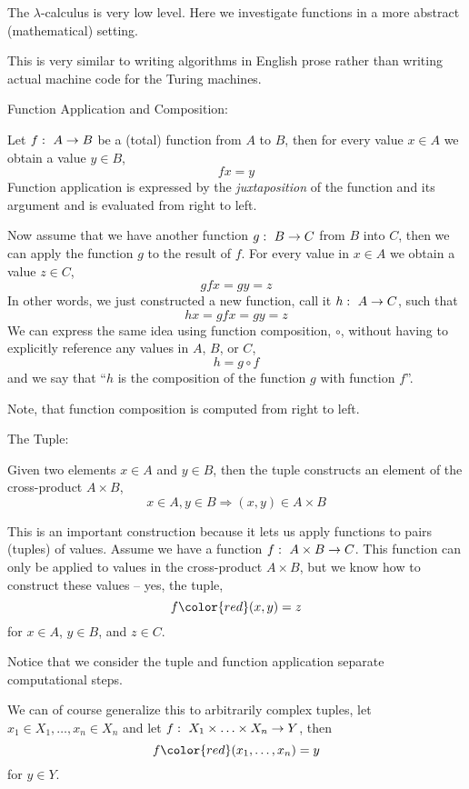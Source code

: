\documentclass[a4paper,blends,pdf,colorBG,slideColor]{prosper}
\begin{document}
The $\lambda$-calculus is very low level.  Here we investigate functions in a more abstract (mathematical) setting.

This is very similar to writing algorithms in English prose rather than writing actual machine code for the 
Turing machines.
\es

\small
Function Application and Composition:

Let $f\,\colon\; A \rightarrow B$ be a (total) function from $A$ to $B$, then
for every value $x\in A$ we obtain a value $y\in B$,
\[
f x = y
\]
Function application is expressed by the {\em juxtaposition} of the function and its argument and
is evaluated from right to left.

Now assume that we have another function $g\,\colon\; B \rightarrow C$ from $B$ into $C$, then
we can apply the function $g$ to the result of $f$.  For every value in $x\in A$
we obtain a value $z\in C$,
\[
g f x = g y = z
\]
In other words, we just constructed a new function, call it $h\,\colon\; A \rightarrow C$, such that
\[
h x = g f x = g y = z
\]
We can express the same idea using function composition, $\circ$, without having to 
explicitly reference any values in $A$, $B$, or $C$,
\[
h = g \circ f
\]
and we say that ``$h$ is the composition of the function $g$ with function $f$''.

Note, that function composition is computed from right to left.

\es

\small
The Tuple:

Given two elements $x\in A$ and $y\in B$, then the tuple constructs an element of the
cross-product $A\times B$,
\[
x\in A, y\in B \Rightarrow (x,y)\in A\times B
\]

This is an important construction because it lets us apply functions to pairs (tuples) of values.
Assume we have a function $f\,\colon\; A\times B \rightarrow C$.  This function
can only be applied to values in the cross-product $A\times B$, but we know how to construct
these values -- yes, the tuple,
\[
f {\color{red}(x,y)} = z
\]
for $x\in A$, $y\in B$, and $z\in C$.

Notice that we consider the tuple and function application separate computational steps.

We can of course generalize this to arbitrarily complex tuples, let $x_1\in X_1,\ldots,x_n\in X_n$
and let $f\,\colon\; X_1\times\ldots\times X_n \rightarrow Y$, then
\[
f {\color{red}(x_1,\ldots,x_n)} = y
\]
for $y\in Y$.
\es
\end{document}
